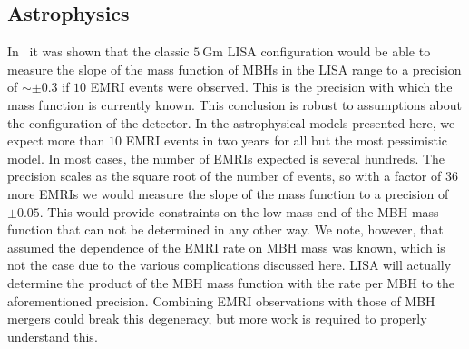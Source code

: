\documentclass[a4paper]{jpconf}
\begin{document}
\subsection{Astrophysics}
In~\cite{GTV} it was shown that the classic $5~\mathrm{Gm}$ LISA configuration would be able to measure the slope of the mass function of MBHs in the LISA range to a precision of $\sim \pm0.3$ if $10$ EMRI events were observed. This is the precision with which the mass function is currently known. This conclusion is robust to assumptions about the configuration of the detector. In the astrophysical models presented here, we expect more than $10$ EMRI events in two years for all but the most pessimistic model. In most cases, the number of EMRIs expected is several hundreds. The  precision scales as the square root of the number of events, so with a factor of $36$ more EMRIs we would measure the slope of the mass function to a precision of $\pm0.05$. This would provide constraints on the low mass end of the MBH mass function that can not be determined in any other way. We note, however, that~\cite{GTV} assumed the dependence of the EMRI rate on MBH mass was known, which is not the case due to the various complications discussed here. LISA will actually determine the product of the MBH mass function with the rate per MBH to the aforementioned precision. Combining EMRI observations with those of MBH mergers could break this degeneracy, but more work is required to properly understand this.
\end{document}
